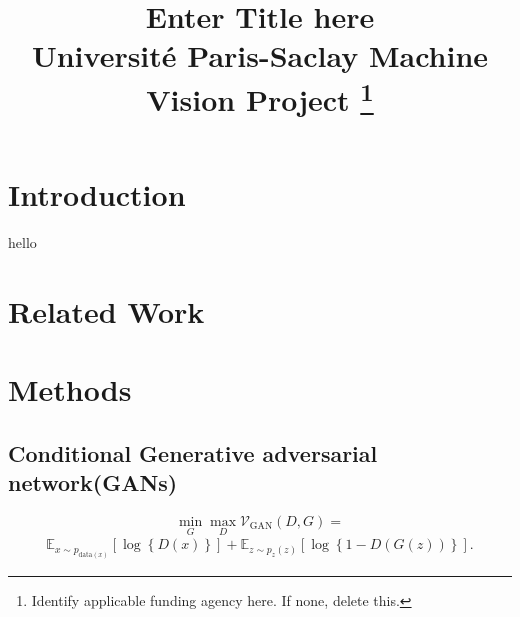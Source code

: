 \documentclass[conference]{IEEEtran}
\begin{document}
\title{Enter Title here\\
{\footnotesize Université Paris-Saclay Machine Vision Project}
\thanks{Identify applicable funding agency here. If none, delete this.}
}

\author{
}

\maketitle

\begin{abstract}

\end{abstract}

\begin{IEEEkeywords}

\end{IEEEkeywords}

\section{Introduction}
hello \cite{DBLP:journals/corr/ZhuPIE17}

\section{Related Work}


\section{Methods}

\subsection{Conditional Generative adversarial network(GANs)}%


\begin{equation}
\min_{G}\max_{D}\mathcal V_{\text{GAN}}\left(D, G \right) = \end{equation}
\begin{align*}
 \mathbb E_{x \sim p_{\text{data}\left( x\right) }}\left[ \log \left\{ D\left( x \right) \right\} \right] + \mathbb E_{z\sim p_{z}\left( z\right)}\left[ \log\left\{ 1 - D\left( G\left( z\right) \right) \right\}\right].   
\end{align*}
\end{document}
